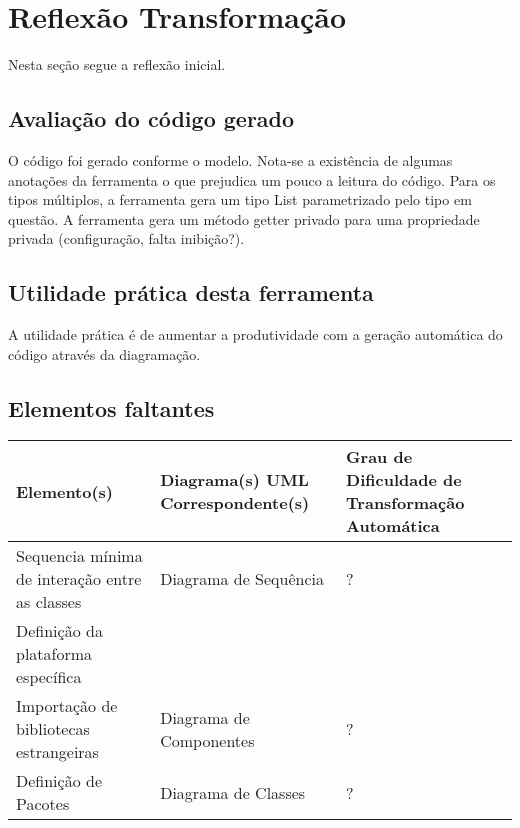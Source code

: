 \section{Reflexão Transformação}

	Nesta seção segue a reflexão inicial.

\subsection{Avaliação do código gerado}

	O código foi gerado conforme o modelo. Nota-se a existência de algumas anotações da ferramenta o que prejudica um pouco a leitura do código. Para os tipos múltiplos, a ferramenta gera um tipo List parametrizado pelo tipo em questão. A ferramenta gera um método getter privado para uma propriedade privada (configuração, falta inibição?).

\subsection{Utilidade prática desta ferramenta}

	A utilidade prática é de aumentar a produtividade com a geração automática do código através da diagramação.

\subsection{Elementos faltantes}

\begin{tabular}{| p{5cm} | p{4cm} | p{5cm} |}
  \hline
  \textbf{Elemento(s)} & \textbf{Diagrama(s) UML Correspondente(s)} & \textbf{Grau de Dificuldade de Transformação Automática} \\
	\hline
  Sequencia mínima de interação entre as classes & Diagrama de Sequência & ? \\
	\hline
  Definição da plataforma específica & &  \\
	\hline
  Importação de bibliotecas estrangeiras & Diagrama de Componentes & ? \\
	\hline
  Definição de Pacotes & Diagrama de Classes & ? \\
	\hline
\end{tabular}